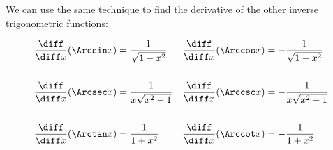 \begin{frame}
\begin{center}
We can use the same technique to find the derivative of the other inverse trigonometric functions:
\end{center}
\begin{align*}
\frac{\diff}{\diff x} (\Arcsin x) & = %
\frac{1}{\sqrt{1-x^2}} &%
\frac{\diff}{\diff x} (\Arccos x) & = %
-\frac{1}{\sqrt{1-x^2}}\\
&&&\\
\frac{\diff}{\diff x} (\Arcsec x) & = %
\frac{1}{x\sqrt{x^2-1}}%
 &%
\frac{\diff}{\diff x} (\Arccsc x) & = %
-\frac{1}{x\sqrt{x^2-1}}  \\%
&&&\\
\frac{\diff}{\diff x} (\Arctan x) & = %
\frac{1}{1+x^2} &%
\frac{\diff}{\diff x} (\Arccot x) & = %
-\frac{1}{1+x^2} %
\end{align*}
\end{frame}
